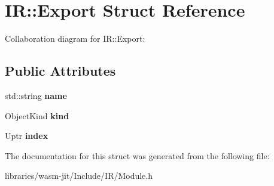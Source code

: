 \hypertarget{struct_i_r_1_1_export}{}\section{IR\+:\+:Export Struct Reference}
\label{struct_i_r_1_1_export}


Collaboration diagram for IR\+:\+:Export\+:
\subsection*{Public Attributes}
\begin{DoxyCompactItemize}
\item 
\mbox{\label{struct_i_r_1_1_export_acf1a148f2b0a0f855b772f014137c359}} 
std\+::string {\bfseries name}
\item 
\mbox{\label{struct_i_r_1_1_export_ab0ed62d449bb60d14ccb2da4fb7659ca}} 
Object\+Kind {\bfseries kind}
\item 
\mbox{\label{struct_i_r_1_1_export_ae452b6cb1b65bd904f3b2b9949f246ea}} 
Uptr {\bfseries index}
\end{DoxyCompactItemize}


The documentation for this struct was generated from the following file\+:\begin{DoxyCompactItemize}
\item 
libraries/wasm-\/jit/\+Include/\+I\+R/Module.\+h\end{DoxyCompactItemize}
